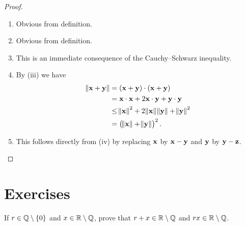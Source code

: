 \begin{proof} \
\begin{enumerate}[label=(\roman*)]
\item Obvious from definition.
\item Obvious from definition.
\item This is an immediate consequence of the Cauchy--Schwarz inequality.
\item By (iii) we have
\begin{align*}
\norm{\vb{x}+\vb{y}}&=(\vb{x}+\vb{y})\cdot(\vb{x}+\vb{y})\\
&=\vb{x}\cdot\vb{x}+2\vb{x}\cdot\vb{y}+\vb{y}\cdot\vb{y}\\
&\le\norm{\vb{x}}^2+2\norm{\vb{x}}\norm{\vb{y}}+\norm{\vb{y}}^2\\
&=\left(\norm{\vb{x}}+\norm{\vb{y}}\right)^2.
\end{align*}
\item This follows directly from (iv) by replacing $\vb{x}$ by $\vb{x}-\vb{y}$ and $\vb{y}$ by $\vb{y}-\vb{z}$.
\end{enumerate}
\end{proof}

\begin{comment}
\begin{definition}
The \vocab{distance between sets} $E\subset\RR^n$ and $F\subset\RR^n$ is defined as
\[ d(E,F)\coloneqq\inf_{x\in E,y\in F}\norm{x-y}. \]
\end{definition}

Obviously $d(E,F)>0$ implies that $E$ and $F$ are disjoint, but $E$ and $F$ may still be disjoint even if $d(E,F)=0$. For example, the closed intervals $E=(-1,0)$ and $F=(0,1)$.

\begin{exercise}
Suppose that $E$ and $F$ are sets in $\RR^n$ where $E$ and $F$ is finite. Prove that $E$ and $F$ are disjoint if and only if $d(E,F)>0$.
\end{exercise}
\end{comment}
\pagebreak

\section*{Exercises}
\begin{exercise}
If $r\in\mathbb Q\setminus\{0\}$ and $x\in\mathbb R\setminus\mathbb Q$, prove that $r+x\in\mathbb R\setminus\mathbb Q$ and $rx\in\mathbb R\setminus\mathbb Q$.
\end{exercise}

